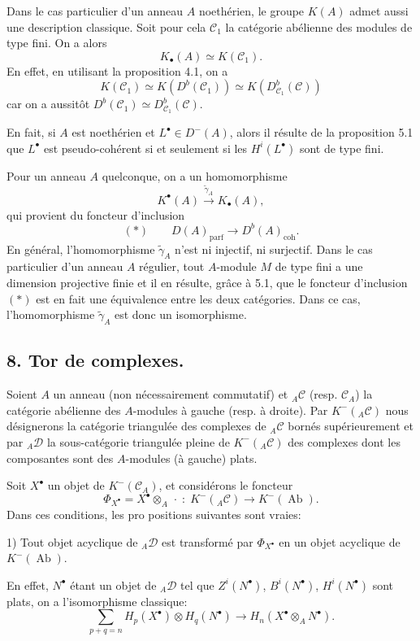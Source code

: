 \documentclass[11pt]{article}
\providecommand{\parf}{\mathrm{parf}}
\providecommand{\coh}{\mathrm{coh}}
\providecommand{\cC}{\mathcal C}
\providecommand{\Ab}{\operatorname{Ab}}
\providecommand{\cC}{\mathcal C}
\providecommand{\cD}{\mathcal D}
\providecommand{\Ab}{\operatorname{Ab}}
\providecommand{\parf}{\mathrm{parf}}
\providecommand{\coh}{\mathrm{coh}}
\begin{document}
Dans le cas particulier d'un anneau $A$ noethérien, le groupe $K(A)$ admet aussi une description classique. Soit pour cela $\cC_1$ la catégorie abélienne des modules de type fini. On a alors
\[
K_\bullet(A)\simeq K(\cC_1).
\]
En effet, en utilisant la proposition 4.1, on a
\[
K(\cC_1)\simeq K(D^b(\cC_1))\simeq K(D^b_{\cC_1}(\cC))
\]
car on a
aussitôt $D^b(\cC_1)\simeq D^b_{\cC_1}(\cC)$.

En fait, si $A$ est noethérien et $L^\bullet\in D^-(A)$, alors il résulte de la proposition 5.1 que $L^\bullet$ est pseudo-cohérent si et seulement si les $H^i(L^\bullet)$ sont de type fini.

Pour un anneau $A$ quelconque, on a un homomorphisme
\[
K^{\bullet}(A)\xrightarrow{\widetilde\gamma_A}K_\bullet(A),
\]
qui provient du foncteur d'inclusion
\[
(*)\qquad D(A)_{\parf}\longrightarrow D^b(A)_{\coh}.
\]
En général, l'homomorphisme $\widetilde\gamma_A$ n'est ni injectif, ni surjectif. Dans le cas particulier d'un anneau $A$ régulier, tout $A$-module $M$ de type fini a une dimension projective finie et il en résulte, grâce à 5.1, que le foncteur d'inclusion $(*)$ est en fait une équivalence entre les deux catégories. Dans ce cas, l'homomorphisme $\widetilde\gamma_A$ est donc un isomorphisme.

\subsection*{8. Tor de complexes.}

Soient $A$ un anneau (non nécessairement commutatif) et ${}_A\cC$ (resp. $\cC_A$) la catégorie abélienne des $A$-modules à gauche (resp. à droite). Par $K^-({}_A\cC)$ nous désignerons la catégorie triangulée des complexes de ${}_A\cC$ bornés supérieurement et par ${}_A\cD$ la sous-catégorie triangulée pleine de $K^-({}_A\cC)$ des complexes dont les composantes sont des $A$-modules (à gauche) plats.

Soit $X^\bullet$ un objet de $K^-(\cC_A)$, et considérons le foncteur
\[
\Phi_{X^\bullet}=X^\bullet\otimes_A\,\cdot\;:\;K^-({}_A\cC)\longrightarrow K^-(\Ab).
\]
Dans ces conditions, les
pro%
positions suivantes sont vraies:

1) Tout objet acyclique de ${}_A\cD$ est transformé par $\Phi_{X^\bullet}$ en un objet acyclique de $K^-(\Ab)$.

En effet, $N^\bullet$ étant un objet de ${}_A\cD$ tel que $Z^i(N^\bullet)$, $B^i(N^\bullet)$, $H^i(N^\bullet)$ sont plats, on a l'isomorphisme classique:
\[
\sum_{p+q=n}H_p(X^\bullet)\otimes H_q(N^\bullet)
\longrightarrow H_n(X^\bullet\otimes_A N^\bullet).
\]
\end{document}
